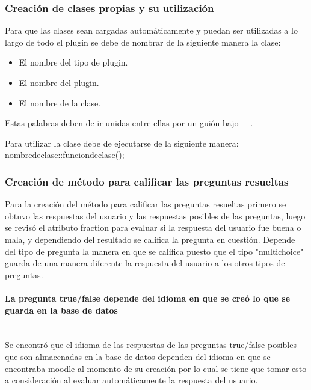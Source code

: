     \subsubsection{Creación de clases propias y su utilización}

		Para que las clases sean cargadas automáticamente y puedan ser utilizadas a lo largo de todo el plugin se debe de nombrar de la siguiente manera la clase:
    \begin{itemize}
      \item El nombre del tipo de plugin.
      \item El nombre del plugin.
      \item El nombre de la clase.
    \end{itemize}

		Estas palabras deben de ir unidas entre ellas por un guión bajo \_ .

    Para utilizar la clase debe de ejecutarse de la siguiente manera:\\
			nombredeclase::funciondeclase();

  \subsubsection{Creación de método para calificar las preguntas resueltas}

		Para la creación del método para calificar las preguntas resueltas primero se obtuvo las respuestas del usuario y las respuestas posibles de las preguntas, luego se revisó el atributo fraction para evaluar si la respuesta del usuario fue buena o mala, y dependiendo del resultado se califica la pregunta en cuestión.
		Depende del tipo de pregunta la manera en que se califica puesto que el tipo "multichoice" guarda de una manera diferente la respuesta del usuario a los otros tipos de preguntas.

    \paragraph{La pregunta true/false depende del idioma en que se creó lo que se guarda en la base de datos}\mbox{}\\

			Se encontró que el idioma de las respuestas de las preguntas true/false posibles que son almacenadas en la base de datos dependen del idioma en que se encontraba moodle al momento de su creación por lo cual se tiene que tomar esto a consideración al evaluar automáticamente la respuesta del usuario.

